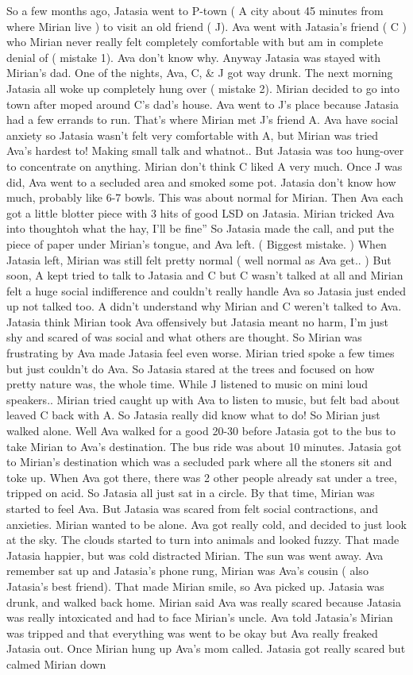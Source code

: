 \documentclass[12pt]{book}
\begin{document}
So a few months ago, Jatasia went to P-town ( A city about 45 minutes from where Mirian live ) to visit an old friend ( J). Ava went with Jatasia's friend ( C ) who Mirian never really felt completely comfortable with but am in complete denial of ( mistake 1). Ava don't know why. Anyway Jatasia was stayed with Mirian's dad. One of the nights, Ava, C, \& J got way drunk. The next morning Jatasia all woke up completely hung over ( mistake 2). Mirian decided to go into town after moped around C's dad's house. Ava went to J's place because Jatasia had a few errands to run. That's where Mirian met J's friend A. Ava have social anxiety so Jatasia wasn't felt very comfortable with A, but Mirian was tried Ava's hardest to! Making small talk and whatnot.. But Jatasia was too hung-over to concentrate on anything. Mirian don't think C liked A very much. Once J was did, Ava went to a secluded area and smoked some pot. Jatasia don't know how much, probably like 6-7 bowls. This was about normal for Mirian. Then Ava each got a little blotter piece with 3 hits of good LSD on Jatasia. Mirian tricked Ava into thoughtoh what the hay, I'll be fine'' So Jatasia made the call, and put the piece of paper under Mirian's tongue, and Ava left. ( Biggest mistake. ) When Jatasia left, Mirian was still felt pretty normal ( well normal as Ava get.. ) But soon, A kept tried to talk to Jatasia and C but C wasn't talked at all and Mirian felt a huge social indifference and couldn't really handle Ava so Jatasia just ended up not talked too. A didn't understand why Mirian and C weren't talked to Ava. Jatasia think Mirian took Ava offensively but Jatasia meant no harm, I'm just shy and scared of was social and what others are thought. So Mirian was frustrating by Ava made Jatasia feel even worse. Mirian tried spoke a few times but just couldn't do Ava. So Jatasia stared at the trees and focused on how pretty nature was, the whole time. While J listened to music on mini loud speakers.. Mirian tried caught up with Ava to listen to music, but felt bad about leaved C back with A. So Jatasia really did know what to do! So Mirian just walked alone. Well Ava walked for a good 20-30 before Jatasia got to the bus to take Mirian to Ava's destination. The bus ride was about 10 minutes. Jatasia got to Mirian's destination which was a secluded park where all the stoners sit and toke up. When Ava got there, there was 2 other people already sat under a tree, tripped on acid. So Jatasia all just sat in a circle. By that time, Mirian was started to feel Ava. But Jatasia was scared from felt social contractions, and anxieties. Mirian wanted to be alone. Ava got really cold, and decided to just look at the sky. The clouds started to turn into animals and looked fuzzy. That made Jatasia happier, but was cold distracted Mirian. The sun was went away. Ava remember sat up and Jatasia's phone rung, Mirian was Ava's cousin ( also Jatasia's best friend). That made Mirian smile, so Ava picked up. Jatasia was drunk, and walked back home. Mirian said Ava was really scared because Jatasia was really intoxicated and had to face Mirian's uncle. Ava told Jatasia's Mirian was tripped and that everything was went to be okay but Ava really freaked Jatasia out. Once Mirian hung up Ava's mom called. Jatasia got really scared but calmed Mirian down 
\end{document}
